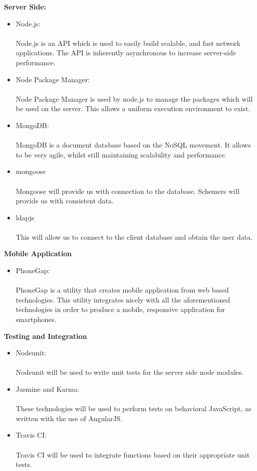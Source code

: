 {\bfseries Server Side:}
\begin{itemize}
	\item Node.js:\\ \\ 
	Node.js is an API which is used to easily build scalable, and fast network applications. The API is inherently asynchronous to increase server-side performance.
	\item Node Package Manager:\\ \\
	Node Package Manager is used by node.js to manage the packages which will be used on the server. This allows a uniform execution environment to exist.
	\item MongoDB: \\ \\
	MongoDB is a document database based on the NoSQL movement. It allows to be very agile, whilst still maintaining scalability and performance.
	\item mongoose \\ \\
	Mongoose will provide us with connection to the database. Schemers will provide us with consistent data.
	\item ldapjs \\ \\
	This will allow us to connect to the client database and obtain the user data.
\end{itemize}
{\bfseries Mobile Application}
\begin{itemize}
	\item PhoneGap:\\ \\
	PhoneGap is a utility that creates mobile application from web based technologies. This utility integrates nicely with all the aforementioned technologies in order to produce a mobile, responsive application for smartphones.
\end{itemize}
{\bfseries Testing and Integration}
\begin{itemize}
	\item Nodeunit:\\ \\
	Nodeunit will be used to write unit tests for the server side node modules.
	\item Jasmine and Karma:\\ \\
	These technologies will be used to perform tests on behavioral JavaScript, as written with the use of AngularJS.
	\item Travis CI:\\ \\
	Travis CI will be used to integrate functions based on their appropriate unit tests.
\end{itemize}